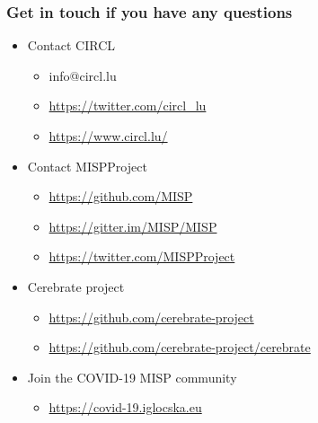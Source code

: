 \begin{frame}
  \frametitle{Get in touch if you have any questions}
  \begin{itemize}
    \item Contact CIRCL
    \begin{itemize}
      \item info@circl.lu
      \item \url{https://twitter.com/circl_lu}
      \item \url{https://www.circl.lu/}
    \end{itemize}
    \item Contact MISPProject 
    \begin{itemize}
      \item \url{https://github.com/MISP}
      \item \url{https://gitter.im/MISP/MISP}
      \item \url{https://twitter.com/MISPProject}
    \end{itemize}
    \item Cerebrate project
    \begin{itemize}
      \item \url{https://github.com/cerebrate-project}
      \item \url{https://github.com/cerebrate-project/cerebrate}
    \end{itemize}
    \item Join the COVID-19 MISP community
    \begin{itemize}
      \item \url{https://covid-19.iglocska.eu}
    \end{itemize}
  \end{itemize}
\end{frame}
